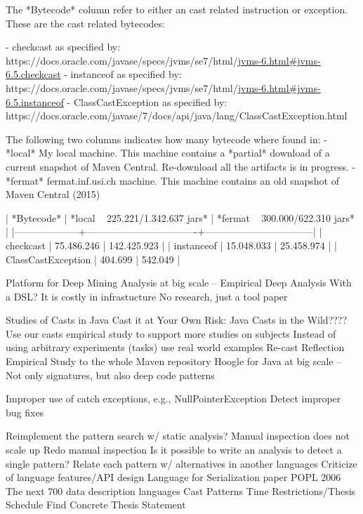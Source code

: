 The *Bytecode* column refer to either an cast related instruction or exception.
These are the cast related bytecodes:

- checkcast as specified by:
https://docs.oracle.com/javase/specs/jvms/se7/html/\url{jvms-6.html#jvms-6.5.checkcast}
- instanceof as specified by:
https://docs.oracle.com/javase/specs/jvms/se7/html/\url{jvms-6.html#jvms-6.5.instanceof}
- ClassCastException as specified by:
https://docs.oracle.com/javase/7/docs/api/java/lang/ClassCastException.html

The following two columns indicates how many bytecode where found in:
- *local*
My local machine.
This machine contains a *partial* download of a current snapshot of Maven Central.
Re-download all the artifacts is in progress.
- *fermat*
fermat.inf.usi.ch machine.
This machine contains an old snapshot of Maven Central (2015) 
 
| *Bytecode*         | *local ~ 225.221/1.342.637 jars* | *fermat ~ 300.000/622.310 jars* |
|--------------------+----------------------------------+---------------------------------|
| checkcast          |                       75.486.246 |                     142.425.923 |
| instanceof         |                       15.048.033 |                      25.458.974 |
| ClassCastException |                          404.699 |                         542.049 |

Platform for Deep Mining Analysis at big scale -- Empirical Deep Analysis
With a DSL?
It is costly in infrastucture
No research, just a tool paper

Studies of Casts in Java
Cast it at Your Own Risk: Java Casts in the Wild????
Use our casts empirical study to support more studies on subjects
Instead of using arbitrary experiments (tasks) use real world examples
Re-cast Reflection Empirical Study to the whole Maven repository
Hoogle for Java at big scale -- Not only signatures, but also deep code patterns

Improper use of catch exceptions, e.g., NullPointerException
Detect improper bug fixes


Reimplement the pattern search w/ static analysis?
Manual inspection does not scale up
Redo manual inspection
Is it possible to write an analysis to detect a single pattern?
Relate each pattern w/ alternatives in another languages
Criticize of language features/API design
Language for Serialization paper POPL 2006
The next 700 data description languages
Cast Patterns
Time Restrictions/Thesis Schedule
Find Concrete Thesis Statement


